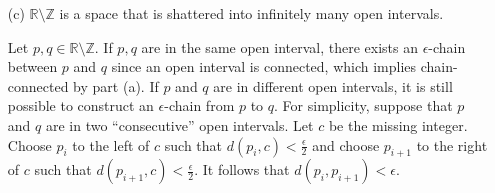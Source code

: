 \begin{solution}
\begin{itemize}
              Thus, it is definitely possible to find an $n_k \ge N$ such that
              $M_{1/n_k} x_{n_k} \subset M_\epsilon c \subset A$. However, this contradicts
              the fact that $M_{1/n_k} x_{n_k} \cap A^c$ is nonempty.

              Therefore, $M$ must be connected.
              \begin{intuition}{}
                  An $\epsilon$-chain must jump across the separation,
                  and compactness forces those ``jump points'', which we defined by \(x_n\), to accumulate,
                  leading to a contradiction.
              \end{intuition}

              \begin{notebox}{Alternative approach}
                  Since $A$ and $A^c$ are compact, disjoint, nonempty subsets of $M$,
                  from \hyperref[prob:p3]{Problem 3}, we can define the distance between $A$ and $A^c$ to
                  be $\delta = d(a_0, b_0) = \inf \{d(a,b) \mid a \in A, b \in A^c\}, a_0 \in A, b_0 \in A^c$.

                  As $\delta > 0$, we choose $\epsilon$ such that $0 < \epsilon < \delta$. Now, it is impossible
                  to construct an $\epsilon$-chain from $p \in A$ to $q \in A^c$ because that would require
                  jumping from $p_i \in A$ to $p_{i+1} \in A^c$. However, we have $d(p_i, p_{i+1}) \ge \delta > \epsilon$.
              \end{notebox}
        \item[(c)]
              $\mathbb{R} \setminus \mathbb{Z}$ is a space that is shattered into infinitely many open intervals.

              Let $p, q \in \mathbb{R} \setminus \mathbb{Z}$. If $p, q$ are in the same open interval, there
              exists an $\epsilon$-chain between $p$ and $q$ since an open interval is connected, which
              implies chain-connected by part (a). If $p$ and $q$ are in different open intervals,
              it is still possible to construct an $\epsilon$-chain from $p$ to $q$. For simplicity, suppose
              that $p$ and $q$ are in two ``consecutive'' open intervals. Let $c$ be the missing
              integer. Choose $p_i$ to the left of $c$ such that $d(p_i, c) < \frac{\epsilon}{2}$ and choose $p_{i+1}$
              to the right of $c$ such that $d(p_{i+1}, c) < \frac{\epsilon}{2}$. It follows that $d(p_i, p_{i+1}) < \epsilon$.


\end{itemize}
\end{solution}
